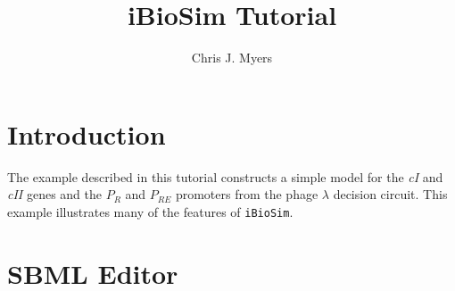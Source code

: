 \documentclass[titlepage,11pt]{article}
\title{iBioSim Tutorial}
\author{Chris J. Myers}
\begin{document}
\maketitle

  
\tableofcontents

\clearpage
  

\section{Introduction}

The example described in this tutorial constructs a simple model for
the \emph{cI} and \emph{cII} genes and the $P_R$ and $P_{RE}$
promoters from the phage $\lambda$ decision circuit.  This example
illustrates many of the features of {\tt iBioSim}.


\section{SBML Editor}
\end{document}
